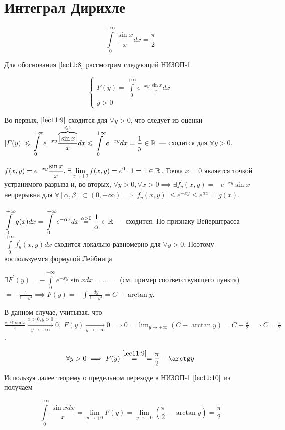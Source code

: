 \documentclass[../../main.tex]{subfiles}
\begin{document}
	\section{Интеграл Дирихле}
	
	\begin{equation}\label{lec11:9}
		\int\limits_0^{+\infty} \frac{\sin x}{x} dx = \frac{\pi}{2}
	\end{equation}	
	
	Для обоснования $\eqref{lec11:8}$ рассмотрим следующий НИЗОП-1
	
	\begin{equation}\label{lec11:10}
		\begin{cases}
			\displaystyle F(y) = \int\limits_0^{+\infty} e^{-xy} \frac{\sin x}{x} dx \\
			y > 0
		\end{cases}
	\end{equation}

	Во-первых, $\eqref{lec11:9}$ сходится для $\forall y > 0$, что следует из оценки $\displaystyle \left|F(y)\right| \leqslant \int\limits_0^{+\infty} e^{-xy} \frac{\overbrace{|\sin x|}^{\leqslant 1}}{x} dx \leqslant \int\limits_0^{+\infty} e^{-xy} dx = \frac{1}{y} \in \mathbb{R}$ --- сходится для $\forall y > 0$. 
	
	$\displaystyle f(x, y) = e^{-xy} \frac{\sin x}{x}. \; \exists \lim_{x \rightarrow +0} f(x, y) = e^0 \cdot 1 = 1 \in \mathbb{R}$. Точка $x = 0$ является точкой устранимого разрыва и, во-вторых, $\displaystyle\forall y > 0, \forall x > 0 \implies \exists f^{'}_y (x, y) = -e^{-xy} \sin x$ непрерывна для $\displaystyle\forall [\alpha, \beta] \subset (0, +\infty) \implies |f^{'}_y (x, y)| \leq e^{-xy} \leq e^{\alpha x} = g(x)$.
	
	$\displaystyle \int\limits_0^{+\infty} g(x) dx = \int\limits_0^{+\infty} e^{-\alpha x} dx \overset{\alpha > 0}{=} \frac{1}{\alpha} \in \mathbb{R}$ --- сходится. По признаку Вейерштрасса $\int\limits_0^{+\infty} f^{'}_y (x, y) dx$ сходится локально равномерно для $\forall y > 0$. Поэтому воспользуемся формулой Лейбница
	
	$\displaystyle \exists F^{'}(y) = - \int\limits_0^{+\infty} e^{-xy} \sin x dx = \ldots = $ (см. пример соответствующего пункта) $\displaystyle = - \frac{1}{1 + y^2} \implies F(y) = - \int \frac{dy}{1 + y^2} = C - \arctan y$.
	
	В данном случае, учитывая, что $\displaystyle\frac{e^{-xy} \sin x}{x} \overset{x > 0, y > 0}{\underset{y \rightarrow +\infty}{\longrightarrow}} 0, \; F(y) \underset{y \rightarrow +\infty}{\longrightarrow} 0 \implies 0 = \lim_{y \rightarrow +\infty} (C - \arctan y) = C - \frac{\pi}{2} \implies C = \frac{\pi}{2}$.

	\begin{equation}\label{lec11:11}
		\forall y > 0 \implies F(y) \overset{\eqref{lec11:9}}{=} = \frac{\pi}{2} - \arctan y
	\end{equation}

	Используя далее теорему о предельном переходе в НИЗОП-1 $\eqref{lec11:10}$ из получаем
	
	$$
	\int\limits_0^{+\infty} \frac{\sin x dx}{x} = \lim_{y \rightarrow +0} F(y) = \lim_{y \rightarrow +0} \left( \frac{\pi}{2} - \arctan y \right) = \frac{\pi}{2}
	$$
\end{document}
